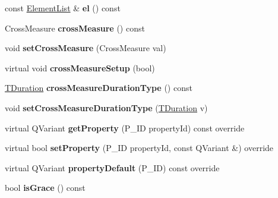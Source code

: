 \begin{DoxyCompactItemize}
const \hyperlink{class_ms_1_1_element_list}{Element\+List} \& {\bfseries el} () const
\item 
\mbox{\label{class_ms_1_1_chord_rest_a34e17dca66c25cbd046523dc0c1c7978}} 
Cross\+Measure {\bfseries cross\+Measure} () const
\item 
\mbox{\label{class_ms_1_1_chord_rest_acc7b8669972325c93c8bc7c819a94b28}} 
void {\bfseries set\+Cross\+Measure} (Cross\+Measure val)
\item 
\mbox{\label{class_ms_1_1_chord_rest_aa6c9d9508154db853b7f66ec4551dfcc}} 
virtual void {\bfseries cross\+Measure\+Setup} (bool)
\item 
\mbox{\label{class_ms_1_1_chord_rest_a1564e474208b08b6bdb6cb0ffce38b08}} 
\hyperlink{class_ms_1_1_t_duration}{T\+Duration} {\bfseries cross\+Measure\+Duration\+Type} () const
\item 
\mbox{\label{class_ms_1_1_chord_rest_ad1a47117e08b36e435b627bde7861886}} 
void {\bfseries set\+Cross\+Measure\+Duration\+Type} (\hyperlink{class_ms_1_1_t_duration}{T\+Duration} v)
\item 
\mbox{\label{class_ms_1_1_chord_rest_a86c1ce829a75bdc6d2beb440e690c627}} 
virtual Q\+Variant {\bfseries get\+Property} (P\+\_\+\+ID property\+Id) const override
\item 
\mbox{\label{class_ms_1_1_chord_rest_afce79be97f19d887ec4e584586478e52}} 
virtual bool {\bfseries set\+Property} (P\+\_\+\+ID property\+Id, const Q\+Variant \&) override
\item 
\mbox{\label{class_ms_1_1_chord_rest_a3925ae7ee2719e07d64e0d1b37352878}} 
virtual Q\+Variant {\bfseries property\+Default} (P\+\_\+\+ID) const override
\item 
\mbox{\label{class_ms_1_1_chord_rest_a80221eef18fa6549f2605eb6a08fa0f3}} 
bool {\bfseries is\+Grace} () const
\item 
\mbox{\label{class_ms_1_1_chord_rest_aef64b1d3c29d7fcb81061bf5bece921a}} 

\end{DoxyCompactItemize}
